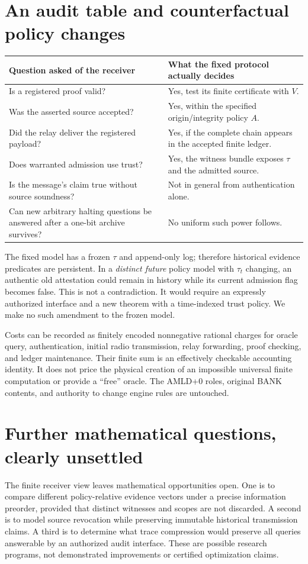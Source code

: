 \documentclass[11pt,letterpaper]{article}
\begin{document}
\section{An audit table and counterfactual policy changes}
\begin{center}\small
\begin{tabular}{@{}p{.37\linewidth}p{.53\linewidth}@{}}\toprule
\textbf{Question asked of the receiver} & \textbf{What the fixed protocol actually decides}\\\midrule
Is a registered proof valid? & Yes, test its finite certificate with $V$.\\
Was the asserted source accepted? & Yes, within the specified origin/integrity policy $A$.\\
Did the relay deliver the registered payload? & Yes, if the complete chain appears in the accepted finite ledger.\\
Does warranted admission use trust? & Yes, the witness bundle exposes $\tau$ and the admitted source.\\
Is the message's claim true without source soundness? & Not in general from authentication alone.\\
Can new arbitrary halting questions be answered after a one-bit archive survives? & No uniform such power follows.\\\bottomrule
\end{tabular}
\end{center}

The fixed model has a frozen $\tau$ and append-only log; therefore historical evidence predicates are persistent. In a \emph{distinct future} policy model with $\tau_t$ changing, an authentic old attestation could remain in history while its current admission flag becomes false. This is not a contradiction. It would require an expressly authorized interface and a new theorem with a time-indexed trust policy. We make no such amendment to the frozen model.

Costs can be recorded as finitely encoded nonnegative rational charges for oracle query, authentication, initial radio transmission, relay forwarding, proof checking, and ledger maintenance. Their finite sum is an effectively checkable accounting identity. It does not price the physical creation of an impossible universal finite computation or provide a ``free'' oracle. The AMLD+0 roles, original BANK contents, and authority to change engine rules are untouched.

\section{Further mathematical questions, clearly unsettled}
The finite receiver view leaves mathematical opportunities open. One is to compare different policy-relative evidence vectors under a precise information preorder, provided that distinct witnesses and scopes are not discarded. A second is to model source revocation while preserving immutable historical transmission claims. A third is to determine what trace compression would preserve all queries answerable by an authorized audit interface. These are possible research programs, not demonstrated improvements or certified optimization claims.
\end{document}
